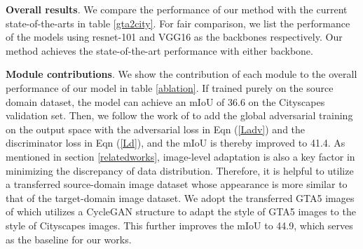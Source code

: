 \documentclass[10pt,twocolumn,letterpaper]{article}
\begin{document}
\textbf{Overall results}. We compare the performance of our method with the current state-of-the-arts in table \ref{gta2city}. For fair comparison, we list the performance of the models using resnet-101 \cite{resnet} and VGG16 \cite{vgg} as the backbones respectively. Our method achieves the state-of-the-art performance with either backbone. 

\textbf{Module contributions}. We show the contribution of each module to the overall performance of our model in table \ref{ablation}. If trained purely on the source domain dataset, the model can achieve an mIoU of 36.6 on the Cityscapes validation set. Then, we follow the work of \cite{outputspace} to add the global adversarial training on the output space with the adversarial loss in Eqn (\ref{Ladv}) and the discriminator loss in Eqn (\ref{Ld}), and the mIoU is thereby improved to 41.4. As mentioned in section \ref{relatedworks}, image-level adaptation is also a key factor in minimizing the discrepancy of data distribution. Therefore, it is helpful to utilize a transferred source-domain image dataset whose appearance is more similar to that of the target-domain image dataset. We adopt the transferred GTA5 images of \cite{bidir} which utilizes a CycleGAN \cite{cyclegan} structure to adapt the style of GTA5 images to the style of Cityscapes images. This further improves the mIoU to 44.9, which serves as the baseline for our works. 
\end{document}
